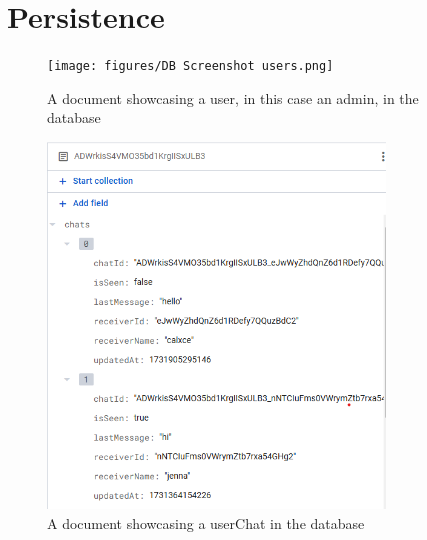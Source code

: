 \section{Persistence}

\begin{figure}[!htb]
    \centering
    \texttt{[image: figures/DB Screenshot users.png]}
    \caption{A document showcasing a user, in this case an admin, in the database}
    \label{fig:userDB}
\end{figure}

\begin{figure}[!htb]
    \centering
    \includegraphics[width=0.8\textwidth]{figures/DB Screenshot userChats.png}
    \caption{A document showcasing a userChat in the database}
    \label{fig:userChatDB}
\end{figure}


